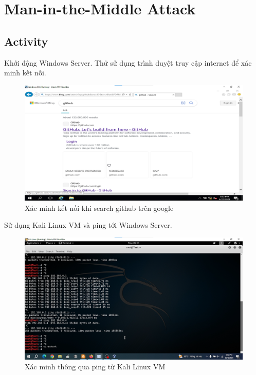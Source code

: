 \section{Man-in-the-Middle Attack}
\subsection{Activity}

 Khởi động Windows Server. Thử sử dụng trình duyệt truy cập internet để xác minh kết nối.

\begin{figure}[!htb]
    \centering
    \includegraphics[width=1\linewidth]{figure//chapter5//lab5_4/verify.png}
    \caption{Xác minh kết nối khi search github trên google}
    \label{fig:enter-label}
\end{figure}

 Sử dụng Kali Linux VM và ping tới Windows Server.

\begin{figure}[!htb]
    \centering
    \includegraphics[width=1\linewidth]{figure//chapter5//lab5_4/verify_kali.png}
    \caption{Xác minh thông qua ping từ Kali Linux VM}
    \label{fig:enter-label}
\end{figure}

